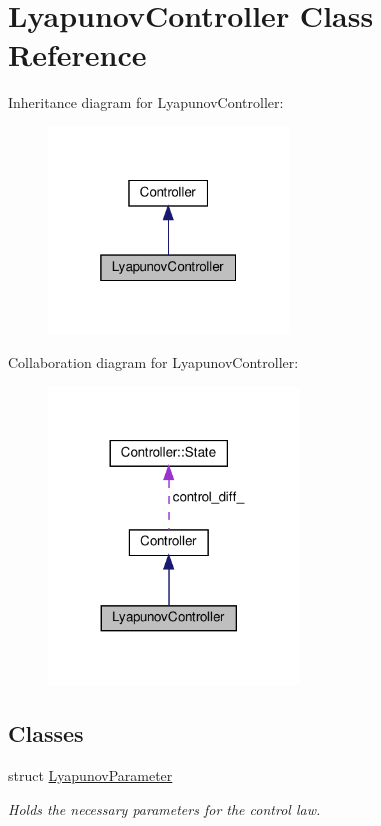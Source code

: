 \hypertarget{classLyapunovController}{}\section{Lyapunov\+Controller Class Reference}
\label{classLyapunovController}


Inheritance diagram for Lyapunov\+Controller\+:\nopagebreak
\begin{figure}[H]
\begin{center}
\leavevmode
\includegraphics[width=181pt]{d9/d75/classLyapunovController__inherit__graph}
\end{center}
\end{figure}


Collaboration diagram for Lyapunov\+Controller\+:\nopagebreak
\begin{figure}[H]
\begin{center}
\leavevmode
\includegraphics[width=188pt]{de/de2/classLyapunovController__coll__graph}
\end{center}
\end{figure}
\subsection*{Classes}
\begin{DoxyCompactItemize}
\item 
struct \hyperlink{structLyapunovController_1_1LyapunovParameter}{Lyapunov\+Parameter}
\begin{DoxyCompactList}\small\item\em Holds the necessary parameters for the control law. \end{DoxyCompactList}\end{DoxyCompactItemize}
